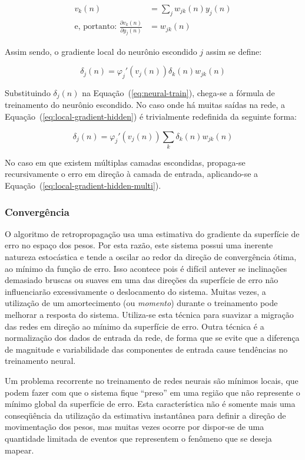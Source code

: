 \begin{align}
v_k(n) &= \sum_{j} w_{jk}(n)y_j(n) \\
\text{e, portanto: } \frac{\partial v_k(n)}{\partial y_j(n)} &= w_{jk}(n)
\end{align}

Assim sendo, o gradiente local do neurônio escondido $j$ assim se define:

\begin{equation}
\delta_j(n) = \varphi_{j}'(v_j(n))\delta_k(n)w_{jk}(n)
\label{eq:local-gradient-hidden}
\end{equation}

Substituindo $\delta_j(n)$ na Equação~(\ref{eq:neural-train}), chega-se a
fórmula de treinamento do neurônio escondido. No caso onde há muitas saídas na
rede, a Equação~(\ref{eq:local-gradient-hidden}) é trivialmente redefinida da
seguinte forma: 

\begin{equation}
\delta_j(n) = \varphi_{j}'(v_j(n))\sum_{k}\delta_k(n)w_{jk}(n)
\label{eq:local-gradient-hidden-multi}
\end{equation}

No caso em que existem múltiplas camadas escondidas, propaga-se recursivamente
o erro em direção à camada de entrada, aplicando-se a
Equação~(\ref{eq:local-gradient-hidden-multi}). 

\subsubsection{Convergência}

O algoritmo de retropropagação usa uma estimativa do gradiente da superfície
de erro no espaço dos pesos. Por esta razão, este sistema possui uma inerente
natureza estocástica e tende a oscilar ao redor da direção de convergência
ótima, ao mínimo da função de erro. Isso acontece pois é difícil antever se
inclinações demasiado bruscas ou suaves em uma das direções da superfície de
erro não influenciarão excessivamente o deslocamento do sistema. Muitas vezes,
a utilização de um amortecimento (ou \emph{momento}) durante o treinamento
pode melhorar a resposta do sistema. Utiliza-se esta técnica para suavizar a
migração das redes em direção ao mínimo da superfície de erro. Outra técnica é
a normalização dos dados de entrada da rede, de forma que se evite que a
diferença de magnitude e variabilidade das componentes de entrada cause
tendências no treinamento neural.

Um problema recorrente no treinamento de redes neurais são mínimos locais, que
podem fazer com que o sistema fique ``preso'' em uma região que não represente
o mínimo global da superfície de erro. Esta característica não é somente mais
uma conseqüência da utilização da estimativa instantânea para definir a
direção de movimentação dos pesos, mas muitas vezes ocorre por dispor-se de
uma quantidade limitada de eventos que representem o fenômeno que se deseja
mapear.

